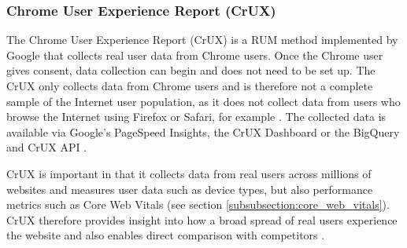 






\subsubsection{Chrome User Experience Report (CrUX)} %

The Chrome User Experience Report (CrUX) is a RUM method implemented by Google that collects real user data from Chrome users.
Once the Chrome user gives consent, data collection can begin and does not need to be set up.
The CrUX only collects data from Chrome users and is therefore not a complete sample of the Internet user population, as it does not collect data from users who browse the Internet using Firefox or Safari, for example \cite{2021Wingerath}.
The collected data is available via Google's PageSpeed Insights, the CrUX Dashboard or the BigQuery and CrUX API \cite{2021Crux}.

CrUX is important in that it collects data from real users across millions of websites and measures user data such as device types, but also performance metrics such as Core Web Vitals (see section \ref{subsubsection:core_web_vitals}).
CrUX therefore provides insight into how a broad spread of real users experience the website and also enables direct comparison with competitors \cite{2020Viscomi}.



